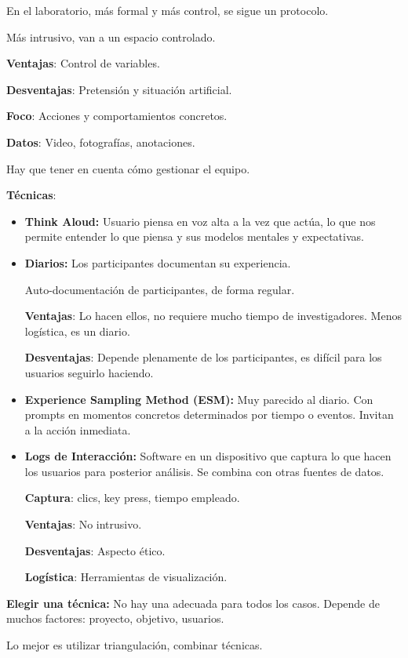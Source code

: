 \documentclass[12pt]{report} %
\begin{document}
En el laboratorio, más formal y más control, se sigue un protocolo.

Más intrusivo, van a un espacio controlado.

\textbf{Ventajas}: Control de variables.

\textbf{Desventajas}: Pretensión y situación artificial.

\textbf{Foco}: Acciones y comportamientos concretos.

\textbf{Datos}: Video, fotografías, anotaciones.

Hay que tener en cuenta cómo gestionar el equipo.

\textbf{Técnicas}:
\begin{itemize}
  \item \textbf{Think Aloud:} Usuario piensa en voz alta a la vez que
  actúa, lo que nos permite entender lo que piensa y sus modelos mentales
  y expectativas.
  \item \textbf{Diarios:} Los participantes documentan su experiencia.
  
  Auto-documentación de participantes, de forma regular.

  \textbf{Ventajas}: Lo hacen ellos, no requiere mucho tiempo
  de investigadores. Menos logística, es un diario.

  \textbf{Desventajas}: Depende plenamente de los
  participantes, es difícil para los usuarios seguirlo haciendo.
  \item \textbf{Experience Sampling Method (ESM):} Muy parecido al
  diario. Con prompts en momentos concretos determinados por tiempo o
  eventos. Invitan a la acción inmediata.
  \item \textbf{Logs de Interacción:} Software en un dispositivo
  que captura lo que hacen los usuarios para posterior análisis.     Se combina con otras fuentes de datos.

  
    \textbf{Captura}: clics, key press, tiempo empleado.

    \textbf{Ventajas}: No intrusivo.

    \textbf{Desventajas}: Aspecto ético.

    \textbf{Logística}: Herramientas de visualización.
\end{itemize}

\textbf{Elegir una técnica:} No hay una adecuada para todos los casos.
Depende de muchos factores: proyecto, objetivo, usuarios.

\hspace{0pt} Lo mejor es utilizar triangulación, combinar técnicas.
\end{document}
